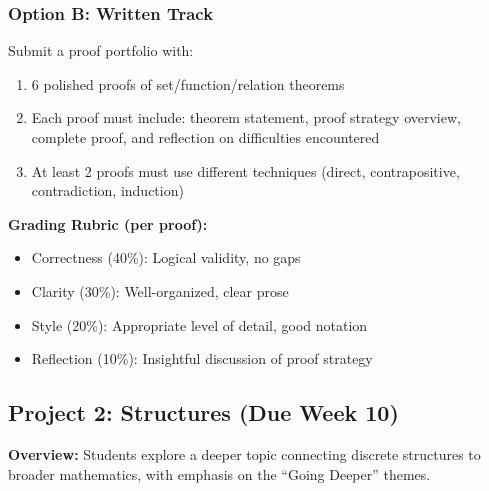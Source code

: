 \documentclass[11pt]{article}
\begin{document}
\subsubsection{Option B: Written Track}
Submit a proof portfolio with:
\begin{enumerate}
    \item 6 polished proofs of set/function/relation theorems
    \item Each proof must include: theorem statement, proof strategy overview, complete proof, and reflection on difficulties encountered
    \item At least 2 proofs must use different techniques (direct, contrapositive, contradiction, induction)
\end{enumerate}

\begin{tipbox}
\textbf{Grading Rubric (per proof):}
\begin{itemize}
    \item Correctness (40\%): Logical validity, no gaps
    \item Clarity (30\%): Well-organized, clear prose
    \item Style (20\%): Appropriate level of detail, good notation
    \item Reflection (10\%): Insightful discussion of proof strategy
\end{itemize}
\end{tipbox}

\subsection{Project 2: Structures (Due Week 10)}

\textbf{Overview:} Students explore a deeper topic connecting discrete structures to broader mathematics, with emphasis on the ``Going Deeper'' themes.
\end{document}
